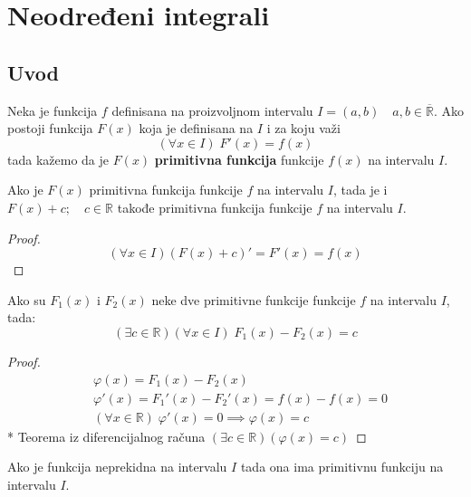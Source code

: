 
\section{Neodređeni integrali} 
\subsection{Uvod} 

\begin{definition}
	Neka je funkcija $f$ definisana na proizvoljnom intervalu $I = (a, b) \quad a,b\in \overline{\mathbb{R}}$. Ako postoji funkcija $F(x)$ koja je definisana na $I$ i za koju važi $$(\forall x \in I)\; F'(x) = f(x)$$ tada kažemo da je $F(x)$ \textbf{primitivna funkcija} funkcije $f(x)$ na intervalu $I$.
\end{definition}

\begin{theorem}
	Ako je $F(x)$ primitivna funkcija funkcije $f$ na intervalu $I$, tada je i $F(x)+c; \quad c \in \mathbb{R}$ takođe primitivna funkcija funkcije $f$ na intervalu $I$.
\end{theorem}

\begin{proof}
	$$(\forall x \in I)(F(x)+c)' = F'(x) = f(x)$$
\end{proof}

\begin{theorem}
	Ako su $F_{1}(x)$ i $F_{2}(x)$ neke dve primitivne funkcije funkcije $f$ na intervalu $I$, tada:
	$$(\exists c \in \mathbb{R})(\forall x \in I)\;F_{1}(x)-F_{2}(x) = c$$
\end{theorem}

\begin{proof}
	\begin{align*}
		&\varphi (x) = F_{1}(x) - F_{2}(x)\\
		&\varphi'(x) = F_{1}'(x) - F_{2}'(x) = f(x)-f(x) = 0\\
		&(\forall x \in \mathbb{R}) \;\varphi'(x) = 0 \implies \varphi(x) = c\
	\end{align*}
	* Teorema iz diferencijalnog računa $(\exists c \in \mathbb{R})(\varphi(x) = c) $
\end{proof}

\begin{theorem}
	Ako je funkcija neprekidna na intervalu $I$ tada ona ima primitivnu funkciju na intervalu $I$.\\
\end{theorem}

